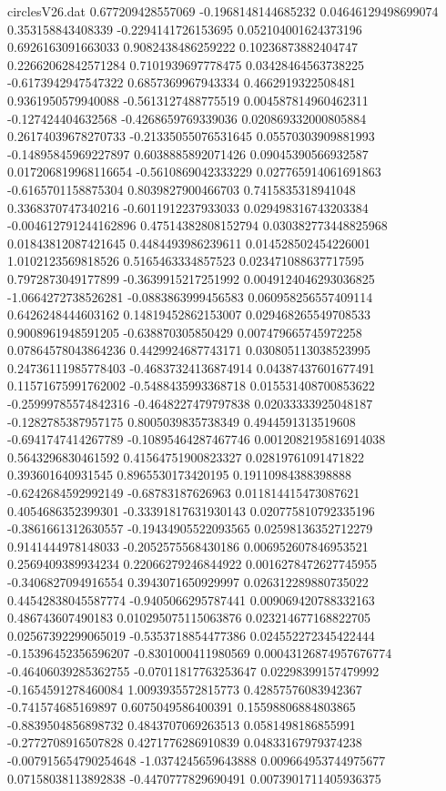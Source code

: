 \begin{filecontents}{circlesV26.dat}
0.677209428557069	-0.1968148144685232	0.04646129498699074
0.353158843408339	-0.2294141726153695	0.052104001624373196
0.6926163091663033	0.9082438486259222	0.10236873882404747
0.22662062842571284	0.7101939697778475	0.03428464563738225
-0.6173942947547322	0.6857369967943334	0.4662919322508481
0.9361950579940088	-0.5613127488775519	0.004587814960462311
-0.127424404632568	-0.4268659769339036	0.020869332000805884
0.26174039678270733	-0.21335055076531645	0.05570303909881993
-0.14895845969227897	0.6038885892071426	0.09045390566932587
0.017206819968116654	-0.5610869042333229	0.027765914061691863
-0.6165701158875304	0.8039827900466703	0.7415835318941048
0.3368370747340216	-0.6011912237933033	0.029498316743203384
-0.004612791244162896	0.47514382808152794	0.030382773448825968
0.01843812087421645	0.4484493986239611	0.014528502454226001
1.0102123569818526	0.5165463334857523	0.023471088637717595
0.7972873049177899	-0.3639915217251992	0.0049124046293036825
-1.0664272738526281	-0.0883863999456583	0.060958256557409114
0.6426248444603162	0.14819452862153007	0.029468265549708533
0.9008961948591205	-0.638870305850429	0.007479665745972258
0.07864578043864236	0.4429924687743171	0.030805113038523995
0.24736111985778403	-0.46837324136874914	0.04387437601677491
0.11571675991762002	-0.5488435993368718	0.015531408700853622
-0.25999785574842316	-0.4648227479797838	0.02033333925048187
-0.1282785387957175	0.8005039835738349	0.4944591313519608
-0.6941747414267789	-0.10895464287467746	0.0012082195816914038
0.5643296830461592	0.41564751900823327	0.02819761091471822
0.393601640931545	0.8965530173420195	0.19110984388398888
-0.6242684592992149	-0.68783187626963	0.011814415473087621
0.4054686352399301	-0.33391817631930143	0.020775810792335196
-0.3861661312630557	-0.19434905522093565	0.02598136352712279
0.9141444978148033	-0.2052575568430186	0.006952607846953521
0.2569409389934234	0.22066279246844922	0.0016278472627745955
-0.3406827094916554	0.3943071650929997	0.026312289880735022
0.44542838045587774	-0.9405066295787441	0.009069420788332163
0.486743607490183	0.010295075115063876	0.023214677168822705
0.02567392299065019	-0.5353718854477386	0.024552272345422444
-0.15396452356596207	-0.8301000411980569	0.00043126874957676774
-0.46406039285362755	-0.07011817763253647	0.02298399157479992
-0.1654591278460084	1.0093935572815773	0.42857576083942367
-0.741574685169897	0.6075049586400391	0.15598806884803865
-0.8839504856898732	0.4843707069263513	0.0581498186855991
-0.2772708916507828	0.4271776286910839	0.04833167979374238
-0.007915654790254648	-1.0374245659643888	0.009664953744975677
0.07158038113892838	-0.4470777829690491	0.0073901711405936375

\end{filecontents}

